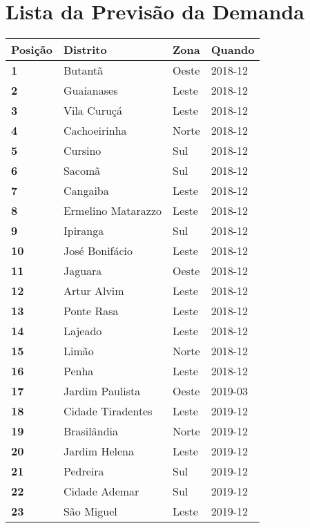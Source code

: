 \newpage

\section{Lista da Previsão da Demanda}
\begin{table}[H]
	\centering
	\begin{tabular}{l|l|l|l}
	\textbf{Posição} & \textbf{Distrito} & \textbf{Zona} & \textbf{Quando} \\ \hline
	\textbf{1} & Butantã & Oeste & 2018-12\\ \hline
	\textbf{2} & Guaianases & Leste & 2018-12\\ \hline
	\textbf{3} & Vila Curuçá & Leste & 2018-12\\ \hline
	\textbf{4} & Cachoeirinha & Norte & 2018-12\\ \hline
	\textbf{5} & Cursino & Sul & 2018-12\\ \hline
	\textbf{6} & Sacomã & Sul & 2018-12\\ \hline
	\textbf{7} & Cangaiba & Leste & 2018-12\\ \hline
	\textbf{8} & Ermelino Matarazzo & Leste & 2018-12\\ \hline
	\textbf{9} & Ipiranga & Sul & 2018-12\\ \hline
	\textbf{10} & José Bonifácio & Leste & 2018-12\\ \hline
	\textbf{11} & Jaguara & Oeste & 2018-12\\ \hline
	\textbf{12} & Artur Alvim & Leste & 2018-12\\ \hline
	\textbf{13} & Ponte Rasa & Leste & 2018-12\\ \hline
	\textbf{14} & Lajeado & Leste & 2018-12\\ \hline
	\textbf{15} & Limão & Norte & 2018-12\\ \hline
	\textbf{16} & Penha & Leste & 2018-12\\ \hline
	\textbf{17} & Jardim Paulista & Oeste & 2019-03\\ \hline
	\textbf{18} & Cidade Tiradentes & Leste & 2019-12\\ \hline
	\textbf{19} & Brasilândia & Norte & 2019-12\\ \hline
	\textbf{20} & Jardim Helena & Leste & 2019-12\\ \hline
	\textbf{21} & Pedreira & Sul & 2019-12\\ \hline
	\textbf{22} & Cidade Ademar & Sul & 2019-12\\ \hline
	\textbf{23} & São Miguel & Leste & 2019-12\\ \hline

\end{tabular}
\end{table}
